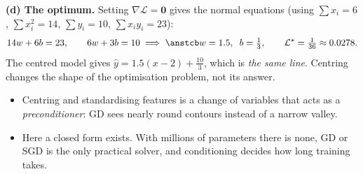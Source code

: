 \begin{frame}{}
  \textbf{(d) The optimum.} Setting $\nabla\mathcal L = \mathbf 0$ gives the normal equations
  (using $\sum x_i = 6$, $\sum x_i^2 = 14$, $\sum y_i = 10$, $\sum x_iy_i = 23$):
  \[
    14w + 6b = 23,\qquad 6w + 3b = 10
    \;\Longrightarrow\; \ans{w = 1.5,\;\; b = \tfrac13}, \qquad \mathcal L^\star = \tfrac1{36} \approx 0.0278 .
  \]
  The centred model gives $\hat y = 1.5(x-2) + \tfrac{10}{3}$, which is \emph{the same line}. Centring changes
  the shape of the optimisation problem, not its answer.

  \vspace{4pt}
  \begin{keybox}
    \small
    \begin{itemize}
      \item Centring and standardising features is a change of variables that acts as a \emph{preconditioner}:
            GD sees nearly round contours instead of a narrow valley.
      \item Here a closed form exists. With millions of parameters there is none, GD or SGD is the only practical
            solver, and conditioning decides how long training takes.
    \end{itemize}
  \end{keybox}
\end{frame}
